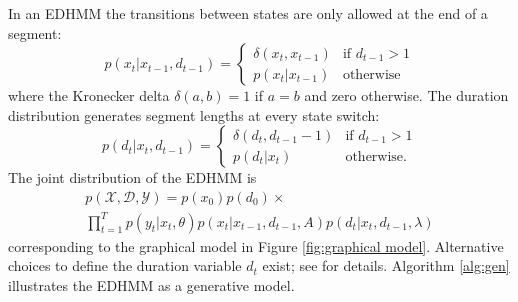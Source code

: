 In an EDHMM the transitions between states are only allowed at the end of a segment:
    \begin{equation}
        p(x_t | x_{t-1}, d_{t-1}) = 
        \begin{cases} 
            \delta(x_t, x_{t-1}) & \textrm{if $d_{t-1} > 1$} \\
            p(x_t | x_{t-1}) & \textrm{otherwise}
        \end{cases}
    \end{equation}
where the Kronecker delta $\delta(a,b) = 1$ if $a=b$ and zero otherwise. The duration distribution generates segment lengths at every state switch:
    \begin{equation}
        p(d_t | x_{t}, d_{t-1}) = 
        \begin{cases} 
            \delta(d_t, d_{t-1}-1) & \textrm{if $d_{t-1} > 1$} \\
            p(d_t | x_{t}) & \textrm{otherwise.}
        \end{cases}
    \end{equation}
The joint distribution of the EDHMM is 
\begin{multline}
    \label{eq:joint}
    p(\mathcal{X},\mathcal{D},\mathcal{Y}) =  
    p(x_0)p(d_0) \times \\ \prod_{t=1}^T p(y_t | x_t, \theta) p(x_t | x_{t-1}, d_{t-1}, A) p(d_t | x_{t}, d_{t-1}, \lambda)
\end{multline}
corresponding to the graphical model in Figure \ref{fig:graphical model}. Alternative choices to define the duration variable $d_t$ exist; see \cite{Chiappa2011} for details. Algorithm \ref{alg:gen} illustrates the EDHMM as a generative model.